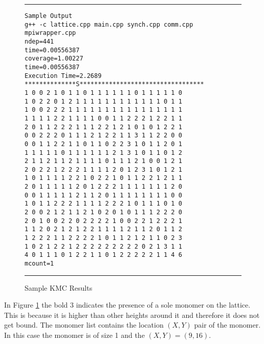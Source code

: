 \begin{figure}
\hrule
\vspace{0.5cm}
\begin{verbatim}
Sample Output
g++ -c lattice.cpp main.cpp synch.cpp comm.cpp mpiwrapper.cpp
ndep=441
time=0.00556387
coverage=1.00227
time=0.00556387
Execution Time=2.2689
**************S**********************************
1 0 0 2 1 0 1 1 0 1 1 1 1 1 1 0 1 1 1 1 1 0
1 0 2 2 0 1 2 1 1 1 1 1 1 1 1 1 1 1 1 0 1 1
1 0 0 2 2 2 1 1 1 1 1 1 1 1 1 1 1 1 1 1 1 1
1 1 1 1 2 2 1 1 1 1 0 0 1 1 2 2 2 1 2 2 1 1
2 0 1 1 2 2 2 1 1 1 2 2 1 2 1 0 1 0 1 2 2 1
0 0 2 2 2 0 1 1 1 2 1 2 2 1 1 3 1 1 2 2 0 0
0 0 1 1 2 2 1 1 0 1 1 0 2 2 3 1 0 1 1 2 0 1
1 1 1 1 1 0 1 1 1 1 1 1 2 1 3 1 0 1 1 0 1 2
2 1 1 2 1 1 2 1 1 1 1 0 1 1 1 2 1 0 0 1 2 1
2 0 2 2 1 2 2 2 1 1 1 1 2 0 1 2 3 1 0 1 2 1
1 0 1 1 1 1 2 2 1 0 2 2 1 0 1 1 2 2 1 2 1 1
2 0 1 1 1 1 1 2 0 1 2 2 2 1 1 1 1 1 1 1 2 0
0 0 1 1 1 1 1 2 1 1 2 0 1 1 1 1 1 1 1 1 0 0
1 0 1 1 2 2 2 1 1 1 1 2 2 2 1 0 1 1 1 0 1 0
2 0 0 2 1 2 1 1 2 1 0 2 0 1 0 1 1 1 2 2 2 0
2 0 1 0 0 2 2 0 2 2 2 2 1 0 0 2 2 1 2 2 2 1
1 1 2 0 2 1 2 1 2 2 1 1 1 1 2 1 1 2 0 1 1 2
1 2 2 2 1 1 2 2 2 2 1 0 1 1 2 1 2 1 1 0 2 3
1 0 2 1 2 2 1 2 2 2 2 2 2 2 2 2 0 2 1 3 1 1
4 0 1 1 1 0 1 2 2 1 1 0 1 2 2 2 2 2 1 1 4 6
mcount=1
\end{verbatim}
\hrule
\caption{Sample KMC Results}
\label{sampleKMC}
\end{figure}

In Figure \ref{sampleKMC} the bold 3 indicates the presence of a sole monomer on the lattice. This is because it is higher than other heights around it and therefore it does not get bound.  The monomer list contains the location $(X,Y)$ pair of the monomer. In this case the monomer is of size 1 and the $(X,Y)=(9,16)$.


